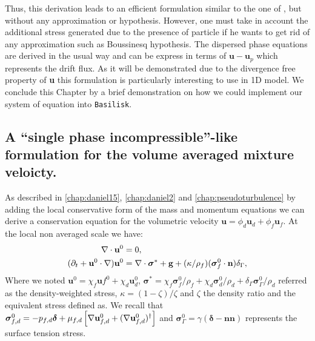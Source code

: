Thus, this derivation leads to an efficient formulation similar to the one of \citet{kriaa2023two}, but without any approximation or hypothesis. 
However, one must take in account the additional stress generated due to the presence of particle if he wants to get rid of any approximation such as Boussinesq hypothesis.
The dispersed phase equations are derived in the usual way and can be express in terms of $\textbf{u}-\textbf{u}_p$ which represents the drift flux. 
As it will be demonstrated due to the divergence free property of \textbf{u} this formulation is particularly interesting to use  in 1D model. 
We conclude this Chapter by a brief demonstration on how we could implement our system of equation into \texttt{Basilisk}. 


\subsection{A ``single phase incompressible''-like formulation for the volume averaged mixture veloicty. }

As described in \ref{chap:daniel15}, \ref{chap:daniel2} and \ref{chap:pseudoturbulence} by adding the local conservative form of the mass and momentum equations we can derive a conservation equation for the volumetric velocity $\textbf{u} =\phi_d\textbf{u}_d + \phi_f \textbf{u}_f$. 
At the local non averaged scale we have: 
\begin{align}
    \label{eq:NSmass0}
    \div \textbf{u}^0 &= 0, \\
    (\pddt 
    + \textbf{u}^0 \cdot \grad) \textbf{u}^0
    &= 
    \div \bm\sigma^*
    +\textbf{g}
    +(\kappa/\rho_f)(\bm\sigma_f^0\cdot \textbf{n})\delta_\Gamma,
    \label{eq:NSmomentum0}
\end{align}
Where we noted $\textbf{u}^0 = \chi_f \textbf{u}f^0 + \chi_d \textbf{u}_d^0$, $\bm\sigma^* = \chi_f \bm\sigma_f^0/\rho_f  + \chi_d \bm\sigma_d^0/\rho_d + \delta_\Gamma \bm\sigma_\Gamma^0/\rho_d $ referred as the density-weighted stress, $\kappa = (1-\zeta)/\zeta$ and $\zeta$ the density ratio and the equivalent stress defined as.
We recall that $\bm\sigma_{f,d}^0 = -p_{f,d}\bm\delta + \mu_{f,d}\left[\mathbf{\nabla} \textbf{u}_{f,d}^0+ (\mathbf{\nabla} \textbf{u}_{f,d}^0)^\dagger\right]$ and $\bm\sigma_\Gamma^0 = \gamma (\bm\delta - \textbf{nn})$ represents the surface tension stress.

